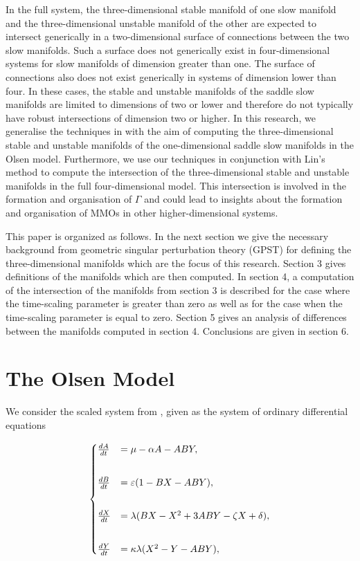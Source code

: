 \documentclass{ws-ijbc}
\begin{document}
In the full system, the three-dimensional stable manifold of one slow manifold and the three-dimensional unstable manifold of the other are expected to intersect generically in a two-dimensional surface of connections between the two slow manifolds.  Such a surface does not generically exist in four-dimensional systems for slow manifolds of dimension greater than one.  The surface of connections also does not exist generically in systems of dimension lower than four.  In these cases, the stable and unstable manifolds of the saddle slow manifolds are limited to dimensions of two or lower and therefore do not typically have robust intersections of dimension two or higher.  In this research, we generalise the techniques in \cite{Saeed_Paper} with the aim of computing the three-dimensional stable and unstable manifolds of the one-dimensional saddle slow manifolds in the Olsen model.  Furthermore, we use our techniques in conjunction with Lin's method to compute the intersection of the three-dimensional stable and unstable manifolds in the full four-dimensional model.  This intersection is involved in the formation and organisation of $\Gamma$ and could lead to insights about the formation and organisation of MMOs in other higher-dimensional systems.

This paper is organized as follows.  In the next section we give the necessary background from geometric singular perturbation theory (GPST) for defining the three-dimensional manifolds which are the focus of this research.  Section 3 gives definitions of the manifolds which are then computed.  In section 4, a computation of the intersection of the manifolds from section 3 is described for the case where the time-scaling parameter is greater than zero as well as for the case when the time-scaling parameter is equal to zero.  Section 5 gives an analysis of differences between the manifolds computed in section 4.  Conclusions are given in section 6.

\section{The Olsen Model}

We consider the scaled system from \cite{Rescaling}, given as the system of ordinary differential equations
    
\begin{equation}
\begin{aligned}
\begin{cases}
\frac{dA}{dt} &= \mu - \alpha A - ABY, \\ \vspace{2mm}\\
\frac{dB}{dt} &= \varepsilon(1-BX - ABY), \\ \vspace{2mm}\\
\frac{dX}{dt} &= \lambda(BX - X^2 +3ABY - \zeta X + \delta), \\ \vspace{2mm}\\
\frac{dY}{dt} &= \kappa\lambda(X^2 - Y - ABY),
\end{cases}
\end{aligned}
\label{equation_1}
\end{equation}
    
\end{document}
